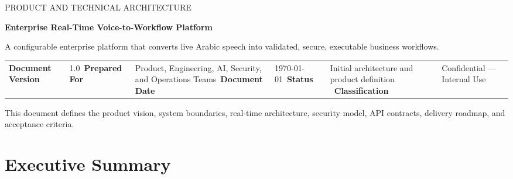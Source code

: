 \documentclass[11pt,a4paper]{article}
\newcommand{\ProjectName}{Enterprise Real-Time Voice-to-Workflow Platform}
\newcommand{\DocumentVersion}{1.0}
\newcommand{\DocumentDate}{\today}
\newcommand{\PreparedFor}{Product, Engineering, AI, Security, and Operations Teams}
\begin{document}
\begin{titlepage}
\thispagestyle{empty}

\vspace*{16mm}

{\sffamily\Large\color{Secondary}
PRODUCT AND TECHNICAL ARCHITECTURE
}

\vspace{8mm}

{\sffamily\bfseries\fontsize{27}{33}\selectfont\color{Primary}
\ProjectName
}

\vspace{5mm}

{\Large\color{TextMuted}
A configurable enterprise platform that converts live Arabic speech
into validated, secure, executable business workflows.
}

\vspace{14mm}

\begin{tcolorbox}[
colback=Surface,
colframe=Border,
boxrule=0.6pt,
arc=2mm,
left=5mm,
right=5mm,
top=4mm,
bottom=4mm
]
\begin{tabularx}{\textwidth}{L{37mm}Y}
\textbf{Document Version} & \DocumentVersion \
\textbf{Prepared For} & \PreparedFor \
\textbf{Document Date} & \DocumentDate \
\textbf{Status} & Initial architecture and product definition \
\textbf{Classification} & Confidential --- Internal Use \
\end{tabularx}
\end{tcolorbox}

\vfill

\begin{center}
{\sffamily\small\color{TextMuted}
This document defines the product vision, system boundaries,
real-time architecture, security model, API contracts,
delivery roadmap, and acceptance criteria.
}
\end{center}
\end{titlepage}

\tableofcontents
\newpage

\section{Executive Summary}
\end{document}

